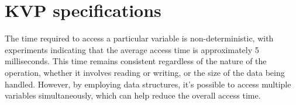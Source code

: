 \section{KVP specifications}

The time required to access a particular variable 
is non-deterministic, with experiments indicating 
that the average access time is approximately 5 
milliseconds. This time remains consistent 
regardless of the nature of the operation, 
whether it involves reading or writing, or the 
size of the data being handled. However, by 
employing data structures, it's possible to 
access multiple variables simultaneously, 
which can help reduce the overall access time.\cite{sanfilippo2015controlling}
